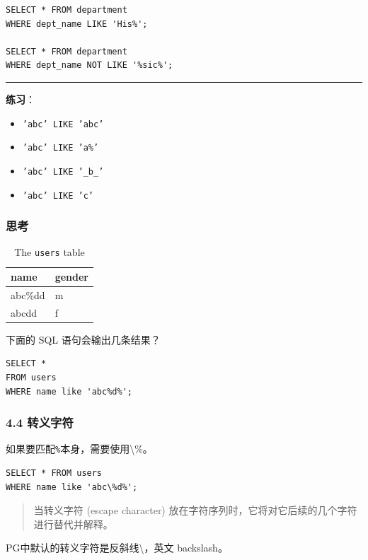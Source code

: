 \documentclass[aspectratio=169, 14pt]{beamer}
\begin{document}
\begin{frame}[fragile]
    \begin{verbatim} 
SELECT * FROM department
WHERE dept_name LIKE 'His%';

SELECT * FROM department
WHERE dept_name NOT LIKE '%sic%';
    \end{verbatim}
    \pause
    \noindent\rule{\textwidth}{1pt}
\textbf{练习}：
\begin{itemize}
    \item \texttt{'abc' LIKE 'abc'}    
    \item \texttt{'abc' LIKE 'a\%'} 
    \item \texttt{'abc' LIKE '\_b\_'} 
    \item \texttt{'abc' LIKE 'c'}
\end{itemize}
\end{frame}

\begin{frame}[fragile]
    \frametitle{思考}

    \begin{table}
        \caption*{The \texttt{users} table}
        \begin{tabular}{ll}
          \toprule
          name & gender \\
          \midrule
          abc\%dd & m \\
          abcdd & f \\
          \bottomrule
        \end{tabular}
    \end{table}
下面的 SQL 语句会输出几条结果？

\begin{verbatim} 
SELECT *
FROM users
WHERE name like 'abc%d%';
\end{verbatim}

\end{frame}

\begin{frame}[fragile]
    \frametitle{4.4 转义字符}
如果要匹配\texttt{\%}本身，需要使用\alert{\textbackslash\%}。
\begin{verbatim} 
SELECT * FROM users
WHERE name like 'abc\%d%';
\end{verbatim}
\begin{quote}
    当\alert{转义字符} (escape character) 放在字符序列时，它将对它后续的几个字符进行替代并解释。
\end{quote}

PG中默认的转义字符是反斜线\textbackslash，英文 backslash。
\end{frame}
\end{document}
